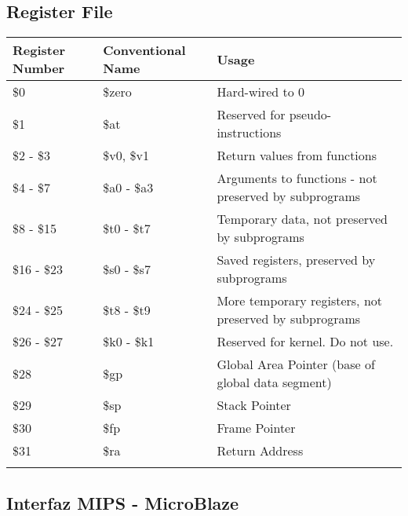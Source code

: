 \documentclass[11pt]{article}
\begin{document}
\subsection{Register File}
\label{sec:orgefc7ded}

\begin{center}
\begin{tabular}{lll}
Register Number & Conventional Name & Usage\\
\hline
\$0 & \$zero & Hard-wired to 0\\
\$1 & \$at & Reserved for pseudo-instructions\\
\$2 - \$3 & \$v0, \$v1 & Return values from functions\\
\$4 - \$7 & \$a0 - \$a3 & Arguments to functions - not preserved by subprograms\\
\$8 - \$15 & \$t0 - \$t7 & Temporary data, not preserved by subprograms\\
\$16 - \$23 & \$s0 - \$s7 & Saved registers, preserved by subprograms\\
\$24 - \$25 & \$t8 - \$t9 & More temporary registers, not preserved by subprograms\\
\$26 - \$27 & \$k0 - \$k1 & Reserved for kernel. Do not use.\\
\$28 & \$gp & Global Area Pointer (base of global data segment)\\
\$29 & \$sp & Stack Pointer\\
\$30 & \$fp & Frame Pointer\\
\$31 & \$ra & Return Address\\
 &  & \\
\end{tabular}
\end{center}
\subsection{Interfaz MIPS - MicroBlaze}
\label{sec:org26d47eb}
\end{document}
